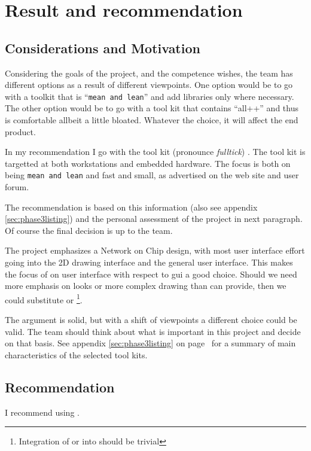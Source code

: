 \section{Result and recommendation}
\label{sec:recommendation}

\subsection{Considerations and Motivation}

Considering the goals of the project, and the competence wishes, the team has
different options as a result of different viewpoints.  One option would be to
go with a toolkit that is ``\texttt{mean and lean}'' and add libraries only
where necessary. The other option would be to go with a tool kit that contains
``all++'' and thus is comfortable allbeit a little bloated. Whatever the
choice, it will affect the end product. 

In my recommendation I go with the tool kit  (pronounce
\emph{fulltick}) . The tool kit is targetted at both workstations and embedded
hardware. The focus is both on being \texttt{mean and lean} and fast and small,
as advertised on the  web site and user forum.

The recommendation is based on this information (also see appendix
\ref{sec:phase3listing}) and the personal assessment of the project in next
paragraph. Of course the final decision is up to the team.

The project emphasizes a Network on Chip design, with most user interface
effort going into the 2D drawing interface and the general user interface.
This makes the focus of  on user interface with respect to gui a good
choice. Should we need more emphasis on looks or more complex drawing than
 can provide, then we could substitute  or
\footnote{Integration of  or  into  should
be trivial}.

\par The argument is solid, but with a shift of viewpoints a different choice
could be valid.  The team should think about what is important in this project
and decide on that basis. See appendix \ref{sec:phase3listing} on
page~\pageref{sec:phase3listing} for a summary of main characteristics of the
selected tool kits.

\subsection{Recommendation} 

I recommend using .

